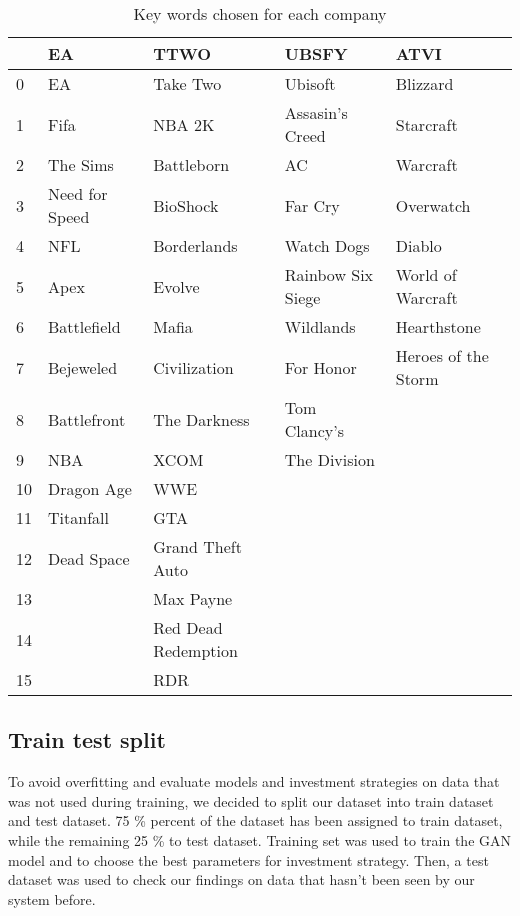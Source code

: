 \documentclass[11pt]{article} %
\begin{document}
\begin{table}[hbt!]
\centering
\caption{Key words chosen for each company}
\begin{tabular}{lllll}
\toprule
{} &              EA &                 TTWO &              UBSFY &                 ATVI \\
\midrule
0  &              EA &             Take Two &            Ubisoft &             Blizzard \\
1  &            Fifa &               NBA 2K &    Assasin's Creed &            Starcraft \\
2  &        The Sims &           Battleborn &                 AC &             Warcraft \\
3  &  Need for Speed &             BioShock &            Far Cry &            Overwatch \\
4  &             NFL &          Borderlands &         Watch Dogs &               Diablo \\
5  &            Apex &               Evolve &  Rainbow Six Siege &    World of Warcraft \\
6  &     Battlefield &                Mafia &          Wildlands &          Hearthstone \\
7  &       Bejeweled &         Civilization &          For Honor &  Heroes of the Storm \\
8  &     Battlefront &         The Darkness &       Tom Clancy's &                  \\
9  &             NBA &                 XCOM &       The Division &                  \\
10 &      Dragon Age &                  WWE &                &                  \\
11 &       Titanfall &                  GTA &                &                  \\
12 &      Dead Space &     Grand Theft Auto &                &                  \\
13 &             &            Max Payne &                &                  \\
14 &             &  Red Dead Redemption &                &                  \\
15 &             &                  RDR &                &                  \\
\bottomrule
\end{tabular}
\end{table}

\subsection{Train test split}
To avoid overfitting and evaluate models and investment strategies on data that was not used during training, we decided to split our dataset into train dataset and test dataset. 75 \% percent of the dataset has been assigned to train dataset, while the remaining 25 \% to test dataset. Training set was used to train the GAN model and to choose the best parameters for investment strategy. Then, a test dataset was used to check our findings on data that hasn't been seen by our system before.
\end{document}
